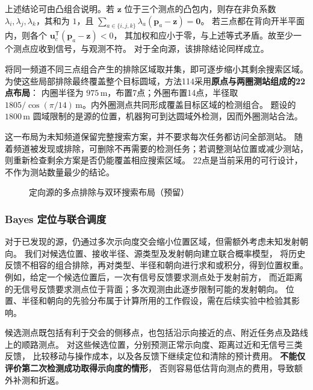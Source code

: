 \documentclass[UTF8,a4paper,12pt]{ctexart}
\begin{document}
上述结论可由凸组合说明。若 $\boldsymbol z$ 位于三个测点的凸包内，则存在非负系数
$\lambda_i,\lambda_j,\lambda_k$，其和为 $1$，且
$\sum_{a\in\{i,j,k\}}\lambda_a(\boldsymbol p_a-\boldsymbol z)=\boldsymbol0$。
若三点都在背向开半平面内，则各个
$\boldsymbol u_c^{\mathsf T}(\boldsymbol p_a-\boldsymbol z)<0$，
其加权和应小于零，与上述等式矛盾。故至少一个测点应收到信号，与观测不符。
对于全向源，该排除结论同样成立。

将同一频道不同三点组合产生的排除区域取并集，即可逐步缩小其剩余搜索区域。
为使这些局部排除最终覆盖整个目标圆域，方法114采用\textbf{原点与两圈测站组成的22点布局}：
内圈半径为 $975\,\mathrm m$，布置7点；外圈布置14点，半径取
$1805/\cos(\pi/14)\,\mathrm m$。内外圈测点共同形成覆盖目标区域的检测组合。
题设的 $1800\,\mathrm m$ 圆域限制的是源的位置，机器狗可到达圆域外检测，因而外圈测站合法。

这一布局为未知频道保留完整搜索方案，并不要求每次任务都访问全部测站。
随着频道被发现或排除，可删除不再需要的检测任务；若调整测站位置或减少测站，
则重新检查剩余方案是否仍能覆盖相应搜索区域。
22点是当前采用的可行设计，不作为测站数量最少的结论。

\begin{figure}[htbp]
  \centering
  \caption{定向源的多点排除与双环搜索布局（预留）}
  \label{fig:q4-coverage}
\end{figure}

\subsubsection{Bayes 定位与联合调度}

对于已发现的源，仍通过多次示向度交会缩小位置区域，但需额外考虑未知发射朝向。
我们对候选位置、接收半径、源类型及发射朝向建立联合概率模型，
将历史反馈不相容的组合排除，再对类型、半径和朝向进行求和或积分，得到位置权重。
例如，给定一个候选位置后，一次有信号反馈要求测点处于发射前方，
而近距离的无信号反馈要求测点位于背面；多次观测由此逐步限制可能的发射朝向。
位置、半径和朝向的先验分布属于计算所用的工作假设，需在后续实验中检验其影响。

候选测点既包括有利于交会的侧移点，也包括沿示向接近的点、附近任务点及路线上的顺路测点。
对这些候选位置，分别预测正常示向度、距离过近和无信号三类反馈，
比较移动与操作成本，以及各反馈下继续定位和清除的预计费用。
\textbf{不能仅评价第二次检测成功取得示向度的情形}，
否则容易低估背向测点的费用，导致额外补测和折返。
\end{document}
